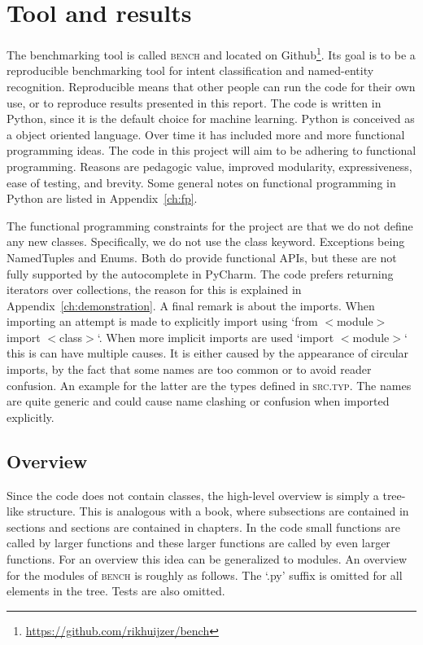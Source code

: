 \section{Tool and results}
\label{sec:bench}
The benchmarking tool is called \textsc{bench} and located on Github\footnote{\url{https://github.com/rikhuijzer/bench}}.
Its goal is to be a reproducible benchmarking tool for intent classification and named-entity recognition.
Reproducible means that other people can run the code for their own use, or to reproduce results presented in this report.
The code is written in Python, since it is the default choice for machine learning.
Python is conceived as a object oriented language.
Over time it has included more and more functional programming ideas.
The code in this project will aim to be adhering to functional programming.
Reasons are pedagogic value, improved modularity, expressiveness, ease of testing, and brevity.
Some general notes on functional programming in Python are listed in Appendix~\ref{ch:fp}.

The functional programming constraints for the project are that we do not define any new classes.
Specifically, we do not use the class keyword.
Exceptions being NamedTuples and Enums.
Both do provide functional APIs, but these are not fully supported by the autocomplete in PyCharm.
The code prefers returning iterators over collections, the reason for this is explained in Appendix~\ref{ch:demonstration}.
A final remark is about the imports.
When importing an attempt is made to explicitly import using `from $<$module$>$ import $<$class$>$`.
When more implicit imports are used `import $<$module$>$` this is can have multiple causes.
It is either caused by the appearance of circular imports, by the fact that some names are too common or to avoid reader confusion.
An example for the latter are the types defined in \textsc{src.typ}.
The names are quite generic and could cause name clashing or confusion when imported explicitly.

\subsection{Overview}
\label{subsec:overview}
Since the code does not contain classes, the high-level overview is simply a tree-like structure.
This is analogous with a book, where subsections are contained in sections and sections are contained in chapters.
In the code small functions are called by larger functions and these larger functions are called by even larger functions.
For an overview this idea can be generalized to modules.
An overview for the modules of \textsc{bench} is roughly as follows.
The `.py' suffix is omitted for all elements in the tree.
Tests are also omitted.

